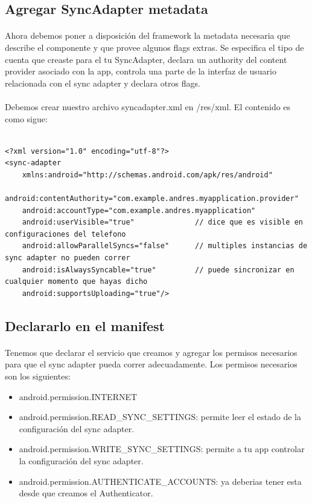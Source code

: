 \documentclass[10pt]{extarticle}
\begin{document}
\subsection{Agregar SyncAdapter metadata}

\paragraph{}
Ahora debemos poner a disposición del framework la metadata necesaria que describe el componente y que provee algunos flags extras. Se especifica el tipo de cuenta que creaste para el tu SyncAdapter, declara un authority del content provider asociado con la app, controla una parte de la interfaz de usuario relacionada con el sync adapter y declara otros flags.

\paragraph{}
Debemos crear nuestro archivo syncadapter.xml en /res/xml. El contenido es como sigue:

\begin{lstlisting}

<?xml version="1.0" encoding="utf-8"?>
<sync-adapter
    xmlns:android="http://schemas.android.com/apk/res/android"
    android:contentAuthority="com.example.andres.myapplication.provider"
    android:accountType="com.example.andres.myapplication"
    android:userVisible="true"				// dice que es visible en configuraciones del telefono
    android:allowParallelSyncs="false"		// multiples instancias de sync adapter no pueden correr
    android:isAlwaysSyncable="true"			// puede sincronizar en cualquier momento que hayas dicho
    android:supportsUploading="true"/>

\end{lstlisting}

\subsection{Declararlo en el manifest}

\paragraph{}
Tenemos que declarar el servicio que creamos y agregar los permisos necesarios para que el sync adapter pueda correr adecuadamente. Los permisos necesarios son los siguientes:

\begin{itemize}
	\item android.permission.INTERNET
	\item android.permission.READ\_SYNC\_SETTINGS: permite leer el estado de la configuración del sync adapter.
	\item android.permission.WRITE\_SYNC\_SETTINGS: permite a tu app controlar la configuración del sync adapter.
	\item android.permission.AUTHENTICATE\_ACCOUNTS: ya deberias tener esta desde que creamos el Authenticator.
\end{itemize}
\end{document}
